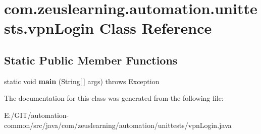 \hypertarget{classcom_1_1zeuslearning_1_1automation_1_1unittests_1_1vpnLogin}{}\section{com.\+zeuslearning.\+automation.\+unittests.\+vpn\+Login Class Reference}
\label{classcom_1_1zeuslearning_1_1automation_1_1unittests_1_1vpnLogin}
\subsection*{Static Public Member Functions}
\begin{DoxyCompactItemize}
\item 
\hypertarget{classcom_1_1zeuslearning_1_1automation_1_1unittests_1_1vpnLogin_a602f8f7606fdadcb97959b09002d9237}{}\label{classcom_1_1zeuslearning_1_1automation_1_1unittests_1_1vpnLogin_a602f8f7606fdadcb97959b09002d9237} 
static void {\bfseries main} (String\mbox{[}$\,$\mbox{]} args)  throws Exception 
\end{DoxyCompactItemize}


The documentation for this class was generated from the following file\+:\begin{DoxyCompactItemize}
\item 
E\+:/\+G\+I\+T/automation-\/common/src/java/com/zeuslearning/automation/unittests/vpn\+Login.\+java\end{DoxyCompactItemize}
